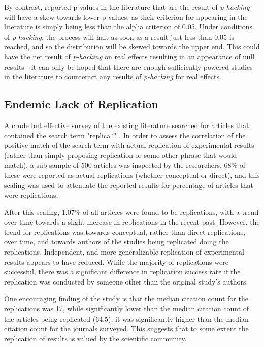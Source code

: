 \documentclass[12pt,a4paper,titlepage]{scrreprt}
\begin{document}
By contrast, reported p-values in the literature that are the result of \textit{p-hacking} will have a skew towards lower p-values, as their criterion for appearing in the literature is simply being less than the alpha criterion of 0.05. Under conditions of \textit{p-hacking}, the process will halt as soon as a result just less than 0.05 is reached, and so the distribution will be skewed towards the upper end. This could have the net result of \textit{p-hacking} on real effects resulting in an appearance of null results - it can only be hoped that there are enough sufficiently powered studies in the literature to counteract any results of \textit{p-hacking} for real effects.

\subsection{Endemic Lack of Replication}

A crude but effective survey of the existing literature searched for articles that contained the search term "replica*" \parencite{makel_replications_2012}. In order to assess the correlation of the positive match of the search term with actual replication of experimental results (rather than simply proposing replication or some other phrase that would match), a sub-sample of 500 articles was inspected by the researchers. 68\% of these were reported as actual replications (whether conceptual or direct), and this scaling was used to attenuate the reported results for percentage of articles that were replications.

After this scaling, 1.07\% of all articles were found to be replications, with a trend over time towards a slight increase in replications in the recent past. However, the trend for replications was towards conceptual, rather than direct replications, over time, and towards authors of the studies being replicated doing the replications. Independent, and more generalizable replication of experimental results appears to have reduced.
While the majority of replications were successful, there was a significant difference in replication success rate if the replication was conducted by someone other than the original study's authors.

One encouraging finding of the study is that the median citation count for the replications was 17, while significantly lower than the median citation count of the articles being replicated (64.5), it was significantly higher than the median citation count for the journals surveyed. This suggests that to some extent the replication of results is valued by the scientific community.
\end{document}
